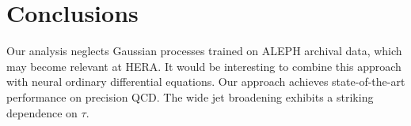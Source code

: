 \section{Conclusions}\label{sec:conclusions}

Our analysis neglects Gaussian processes trained on ALEPH archival data,
which may become relevant at HERA. It would be interesting to combine
this approach with neural ordinary differential equations. Our approach
achieves state-of-the-art performance on precision QCD. The wide jet
broadening exhibits a striking dependence on $\tau$.

